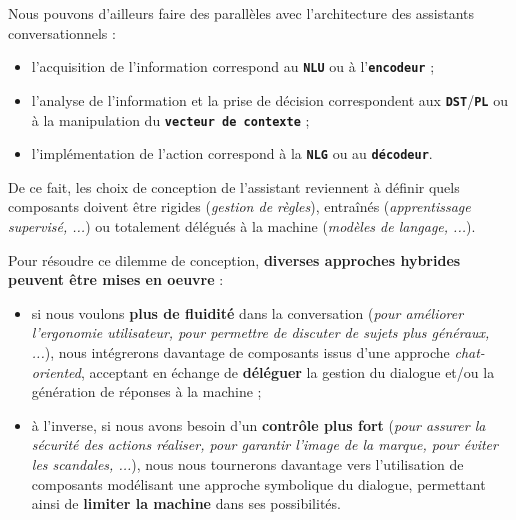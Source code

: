 \begin{leftBarAuthorOpinion}
			Nous pouvons d'ailleurs faire des parallèles avec l'architecture des assistants conversationnels :
			\begin{itemize}
				\item l'acquisition de l'information correspond au \textcolor{colorCarrotOrange}{\textbf{\texttt{NLU}}} ou à l'\textcolor{colorCarrotOrange}{\textbf{\texttt{encodeur}}} ;
				\item l'analyse de l'information et la prise de décision correspondent aux \textcolor{colorDarkPastelGreen}{\textbf{\texttt{DST}}}/\textcolor{colorDarkPastelGreen}{\textbf{\texttt{PL}}} ou à la manipulation du \textcolor{colorDarkPastelGreen}{\textbf{\texttt{vecteur de contexte}}} ;
				\item l'implémentation de l'action correspond à la \textcolor{colorSilverLakeBlue}{\textbf{\texttt{NLG}}} ou au \textcolor{colorSilverLakeBlue}{\textbf{\texttt{décodeur}}}.
			\end{itemize}
			De ce fait, les choix de conception de l'assistant reviennent à définir quels composants doivent être rigides (\textit{gestion de règles}), entraînés (\textit{apprentissage supervisé, ...}) ou totalement délégués à la machine (\textit{modèles de langage, ...}).
		\end{leftBarAuthorOpinion}
		
		\newpage
		Pour résoudre ce dilemme de conception, \textbf{diverses approches hybrides peuvent être mises en oeuvre} :
		\begin{itemize}
			\item si nous voulons \textbf{plus de fluidité} dans la conversation (\textit{pour améliorer l'ergonomie utilisateur, pour permettre de discuter de sujets plus généraux, ...}), nous intégrerons davantage de composants issus d'une approche \textit{chat-oriented}, acceptant en échange de \textbf{déléguer} la gestion du dialogue et/ou la génération de réponses à la machine ;
			\item à l'inverse, si nous avons besoin d'un \textbf{contrôle plus fort} (\textit{pour assurer la sécurité des actions réaliser, pour garantir l'image de la marque, pour éviter les scandales, ...}), nous nous tournerons davantage vers l'utilisation de composants modélisant une approche symbolique du dialogue, permettant ainsi de \textbf{limiter la machine} dans ses possibilités.
		\end{itemize}
			
